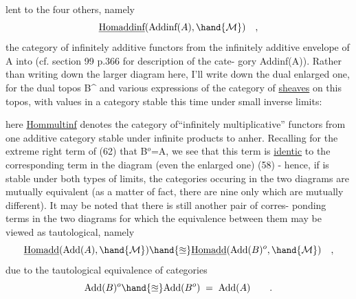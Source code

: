 
lent to the four others,  namely 
\[ \underline{\text{Homaddinf}}(\text{Addinf}(A),\hand{\mathcal{M}}) \quad , \]
the category of infinitely additive functors from the infinitely additive
envelope of A into  (cf.  section 99 p.366 for description of the cate-%
gory Addinf(A)).  Rather than writing down the larger diagram here,  I'll
write down the dual enlarged one, for the  dual topos B\^{} and  various
expressions of the category of \uline{sheaves} on this topos,  with values in a
category  stable this time under small inverse limits:

here \uline{Hommultinf}  denotes the category of``infinitely multiplicative''
functors from one additive category stable under infinite products to
anher.  Recalling for the extreme right term of (62) that B$^{o}$=A,  we see
that this term is \uline{identic} to the corresponding term in the diagram (even
the enlarged one) (58)  -  hence,  if  is stable under both types of
limits,  the  categories occuring  in the two diagrams are mutually
equivalent (as a matter of fact,  there are nine only which are mutually
different).  It may be noted that there is still another pair of corres-%
ponding terms in the two diagrams for which the equivalence between them
may be viewed as tautological,  namely
\[ \underline{\text{Homadd}}(\text{Add}(A),\hand{\mathcal{M}}) \hand{\approxeq} \underline{\text{Homadd}}(\text{Add}(B)^{o},\hand{\mathcal{M}}) \quad , \]
due to the tautological equivalence of categories
\[ \text{Add}(B)^{o} \hand{\approxeq} \text{Add}(B^{o}) \;=\; \text{Add}(A) \qquad . \]

